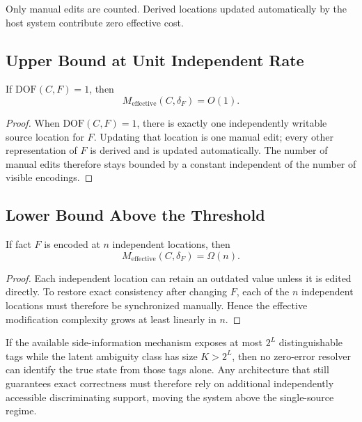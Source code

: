 Only manual edits are counted. Derived locations updated automatically by the host system contribute zero effective cost.

\subsection{Upper Bound at Unit Independent Rate}\label{sec:upper-bound}

\begin{theorem}\label{thm:upper-bound}
If $\text{DOF}(C,F)=1$, then
\[
M_{\mathrm{effective}}(C,\delta_F)=O(1).
\]
\end{theorem}

\begin{proof}
When $\text{DOF}(C,F)=1$, there is exactly one independently writable source location for $F$. Updating that location is one manual edit; every other representation of $F$ is derived and is updated automatically. The number of manual edits therefore stays bounded by a constant independent of the number of visible encodings.
\end{proof}

\subsection{Lower Bound Above the Threshold}\label{sec:lower-bound}

\begin{theorem}\label{thm:lower-bound}
If fact $F$ is encoded at $n$ independent locations, then
\[
M_{\mathrm{effective}}(C,\delta_F)=\Omega(n).
\]
\end{theorem}

\begin{proof}
Each independent location can retain an outdated value unless it is edited directly. To restore exact consistency after changing $F$, each of the $n$ independent locations must therefore be synchronized manually. Hence the effective modification complexity grows at least linearly in $n$.
\end{proof}

\begin{lemma}\label{lem:info-dof}
If the available side-information mechanism exposes at most $2^L$ distinguishable tags while the latent ambiguity class has size $K>2^L$, then no zero-error resolver can identify the true state from those tags alone. Any architecture that still guarantees exact correctness must therefore rely on additional independently accessible discriminating support, moving the system above the single-source regime.
\end{lemma}


